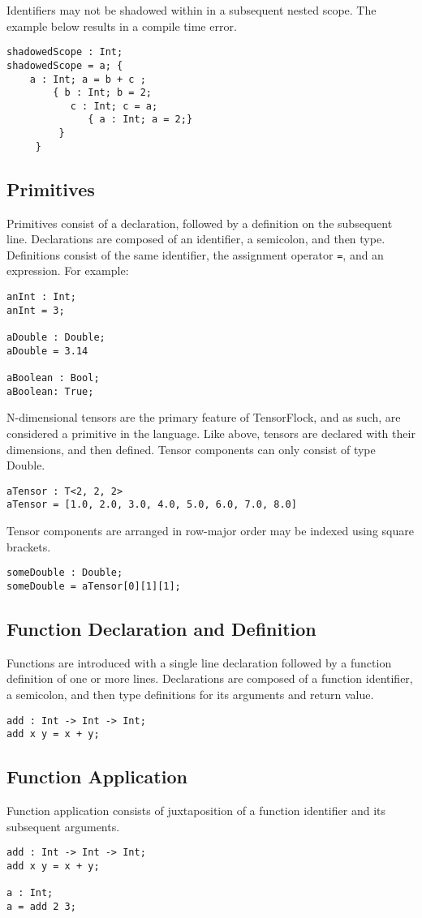 Identifiers may not be shadowed within in a subsequent nested scope. The example below results in a compile time error.
\begin{lstlisting}
shadowedScope : Int;
shadowedScope = a; {
    a : Int; a = b + c ;
        { b : Int; b = 2;
           c : Int; c = a;
              { a : Int; a = 2;}
         }
     }
\end{lstlisting}
\subsection{Primitives}
Primitives consist of a declaration, followed by a definition on the subsequent line. Declarations are composed of an identifier, a semicolon, and then type. Definitions consist of the same identifier, the assignment operator \lstinline|=|, and an expression. For example:
\begin{lstlisting}
anInt : Int;
anInt = 3;

aDouble : Double;
aDouble = 3.14

aBoolean : Bool;
aBoolean: True;
\end{lstlisting}

N-dimensional tensors are the primary feature of TensorFlock, and as such, are considered a primitive in the language. Like above, tensors are declared with their dimensions, and then defined. Tensor components can only consist of type Double. 
\begin{lstlisting}
aTensor : T<2, 2, 2>
aTensor = [1.0, 2.0, 3.0, 4.0, 5.0, 6.0, 7.0, 8.0]
\end{lstlisting}
Tensor components are arranged in row-major order may be indexed using square brackets.
\begin{lstlisting}
someDouble : Double;
someDouble = aTensor[0][1][1];
\end{lstlisting}
\subsection{Function Declaration and Definition}
Functions are introduced with a single line declaration followed by a function definition of one or more lines. Declarations are composed of a function identifier, a semicolon, and then type definitions for its arguments and return value.
\begin{lstlisting}
add : Int -> Int -> Int;
add x y = x + y;
\end{lstlisting}
\subsection{Function Application}
Function application consists of juxtaposition of a function identifier and its subsequent arguments.
\begin{lstlisting}
add : Int -> Int -> Int;
add x y = x + y;

a : Int;
a = add 2 3;
\end{lstlisting}

